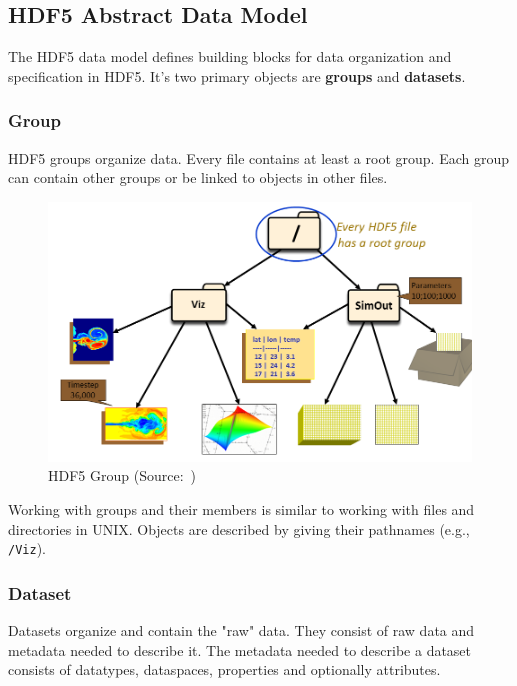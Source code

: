 \documentclass[thesis=M,english]{FITthesis}[2019/12/23]
\begin{document}
\subsection{HDF5 Abstract Data Model}

The HDF5 data model defines building blocks for data organization and specification in HDF5.
It's two primary objects are \textbf{groups} and \textbf{datasets}.

\subsubsection{Group}

HDF5 groups organize data. Every file contains at least a root group.
Each group can contain other groups or be linked to objects in other files.

\begin{figure}[!h]
    \centering
    \includegraphics[scale=0.3]{static/group.png}
    \caption{HDF5 Group (Source:~\cite{hdf5})}
\end{figure}

Working with groups and their members is similar to working with files and directories in UNIX.
Objects are described by giving their pathnames (e.g., \texttt{/Viz}).

\subsubsection{Dataset}

Datasets organize and contain the "raw" data. They consist of raw data and metadata needed to describe it.
The metadata needed to describe a dataset consists of datatypes, dataspaces, properties and optionally
attributes.
\end{document}
